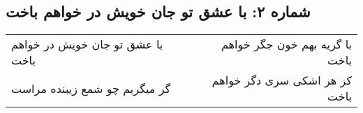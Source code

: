 \begin{center}
\section*{شماره ۲: با عشق تو جان خویش در خواهم باخت}
\label{sec:002}
\begin{longtable}{l p{0.5cm} r}
با عشق تو جان خویش در خواهم باخت
&&
با گریه بهم خون جگر خواهم باخت
\\
گر میگریم چو شمع زیبنده مراست
&&
کز هر اشکی سری دگر خواهم باخت
\\
\end{longtable}
\end{center}
